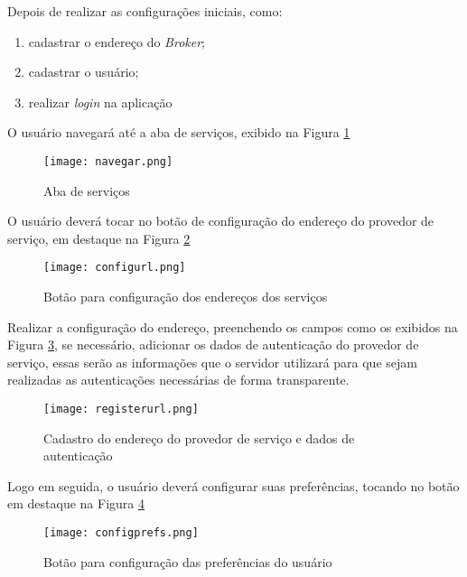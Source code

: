 Depois de realizar as configurações iniciais, como:
\begin{enumerate}
  \item cadastrar o endereço do \textit{Broker};
  \item cadastrar o usuário;
  \item realizar \textit{login} na aplicação
\end{enumerate}

O usuário navegará até a aba de serviços, exibido na Figura \ref{fig:navegar}

\begin{figure}[!htb]
  \centering
  \texttt{[image: navegar.png]} %
  \caption[Aba de serviços]{Aba de serviços}
  \label{fig:navegar}
\end{figure}

O usuário deverá tocar no botão de configuração do endereço do provedor de serviço, em destaque na Figura \ref{fig:configurl}

\begin{figure}[!htb]
  \centering
  \texttt{[image: configurl.png]} %
  \caption[Botão para configuração dos endereços dos serviços]{Botão para configuração dos endereços dos serviços}
  \label{fig:configurl}
\end{figure}

Realizar a configuração do endereço, preenchendo os campos como os exibidos na Figura \ref{fig:registerurl}, se necessário, adicionar os dados de autenticação do provedor de serviço, essas serão as informações que o servidor utilizará para que sejam realizadas as autenticações necessárias de forma transparente.

\begin{figure}[!htb]
  \centering
  \texttt{[image: registerurl.png]} %
  \caption[Cadastro do endereço do provedor de serviço e dados de autenticação]{Cadastro do endereço do provedor de serviço e dados de autenticação}
  \label{fig:registerurl}
\end{figure}

Logo em seguida, o usuário deverá configurar suas preferências, tocando no botão em destaque na Figura \ref{fig:configprefs}

\begin{figure}[!htb]
  \centering
  \texttt{[image: configprefs.png]} %
  \caption[Botão para configuração das preferências do usuário]{Botão para configuração das preferências do usuário}
  \label{fig:configprefs}
\end{figure}

